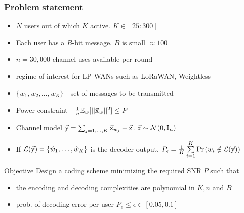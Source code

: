\begin{frame}\frametitle{Problem statement}
  \begin{itemize}
  \setlength{\itemsep}{3pt}
  \item $N$ users out of which $K$ active. $K\in[25:300]$
  \item Each user has a $B$-bit message. $B$ is small $\approx 100$
  \item $n=30,000$ channel uses available per round
  \item {\small regime of interest for LP-WANs such as LoRaWAN, Weightless}
\end{itemize}
  \pause
  \vspace{2ex}

  \begin{itemize}
  \item $\{w_1,w_2,\ldots,w_K\}$ - set of messages to be transmitted
  \item Power constraint -$~\frac{1}{n}\mathbb{E}_w[||\vec{\mathrm{x}}_w||^2]\leq P$
  \item Channel model $\vec{\mathrm{y}}=\sum_{j=1,\ldots,K}\vec{\mathrm{x}}_{w_j}+\vec{\mathrm{z}}$. $\vec{z}\sim\mathcal{N}(0,\mathbf{I}_n)$
  \item If $\mathcal{L}(\vec{\mathrm{y}})=\{\hat{w}_1,\ldots,\hat{w}_K\}$ is the decoder output, $P_e=\frac{1}{K}\sum\limits_{i=1}^{K} \Pr\left( w_i \notin \mathcal{L}(\vec{\mathrm{y}}) \right) $
  \end{itemize}
      \pause
      \vspace{3ex}
  \begin{block}{Objective}
 Design a coding scheme minimizing the required SNR $P$ such that 
 \begin{itemize}
 \item the encoding and decoding complexities are polynomial in $K,n$ and $B$
 \item prob. of decoding error per user $P_e\leq \epsilon\in [0.05,0.1]$
\end{itemize} 
  \end{block}
 
\end{frame}

